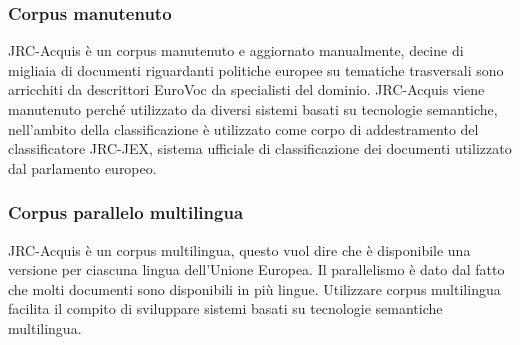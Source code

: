 \documentclass{article}
\theoremstyle{plain}
\theoremstyle{definition}
\begin{document}
\subsubsection{Corpus manutenuto}
JRC-Acquis è un corpus manutenuto e aggiornato manualmente, decine di migliaia di documenti riguardanti politiche europee su tematiche trasversali sono arricchiti da descrittori EuroVoc da specialisti del dominio. JRC-Acquis viene manutenuto perché utilizzato da diversi sistemi basati su tecnologie semantiche, nell'ambito della classificazione è utilizzato come corpo di addestramento del classificatore JRC-JEX, sistema ufficiale di classificazione dei documenti utilizzato dal parlamento europeo.

\subsubsection{Corpus parallelo multilingua}
JRC-Acquis è un corpus multilingua, questo vuol dire che è disponibile una versione per ciascuna lingua dell'Unione Europea. Il parallelismo è dato dal fatto che molti documenti sono disponibili in più lingue. Utilizzare corpus multilingua facilita il compito di sviluppare sistemi basati su tecnologie semantiche multilingua.

\newpage
\end{document}
